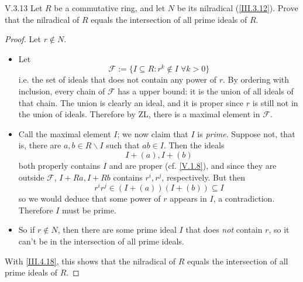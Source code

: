 \begin{problem}{V.3.13}
Let $R$ be a commutative ring, and let $N$ be its nilradical (\ref{III.3.12}). Prove that the nilradical of $R$ equals the intersection of all prime ideals of $R$.
\end{problem}
\begin{proof}
Let $r \notin N$.
\begin{itemize}
	\setlength\itemsep{0pt}
	\item Let
	\[
	\mathscr{F} := \{I \subseteq R: r^k \notin I \; \forall k>0\}
	\]
	i.e. the set of ideals that does not contain any power of $r$. By ordering with inclusion, every chain of $\mathcal{F}$ has a upper bound: it is the union of all ideals of that chain. The union is clearly an ideal, and it is proper since $r$ is still not in the union of ideals. Therefore by ZL, there is a maximal element in $\mathscr{F}$.
	\item Call the maximal element $I$; we now claim that $I$ is \emph{prime}. Suppose not, that is, there are $a,b \in R \backslash I$ such that $ab \in I$. Then the ideals
	\[
	I + (a), I+(b)
	\]
	both properly contains $I$ and are proper (cf. \ref{V.1.8}), and since they are outside $\mathscr{F}$, $I+Ra, I+Rb$ contains $r^i,r^j$, respectively. But then
	\[
	r^i r^j \in (I+(a))(I+(b)) \subseteq I
	\]
	so we would deduce that some power of $r$ appears in $I$, a contradiction. Therefore $I$ must be prime.
	\item So if $r \notin N$, then there are some prime ideal $I$ that does \emph{not} contain $r$, so it can't be in the intersection of all prime ideals.
\end{itemize}
With \ref{III.4.18}, this shows that the nilradical of $R$ equals the intersection of all prime ideals of $R$.
\end{proof}

